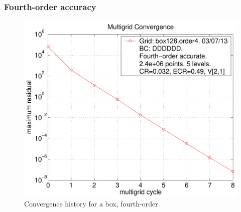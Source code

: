 
\clearpage
\subsubsection{Fourth-order accuracy}

\begin{figure}[hbt]
\begin{center}
  \includegraphics[width=.475\linewidth]{fig/residual_box128_order4}
  \end{center} 
\caption{Convergence history for a box, fourth-order.}
\label{fig:box}
\end{figure}




